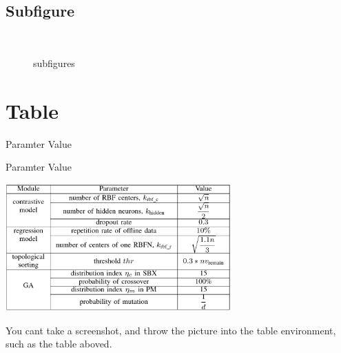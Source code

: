 \documentclass[
    UTF8
]{report}
\begin{document}
\subsection{Subfigure}

\begin{figure}[H]
    \centering
    \hspace{1em}
    ~\\
    \hspace{1em}
    \caption{subfigures}
    \label{fig:subfig}
\end{figure}

\section{Table}
\begin{table}[H]
    \centering
    \caption{Paramter Value}
    \label{tb:paramter}
    
\end{table}
\begin{table}[H]
    \centering
    \caption{Paramter Value}
    \label{tb:figure}
    \includegraphics[width=0.65\textwidth]{./table/figure.png}
\end{table}
You cant take a screenshot, and throw the picture into the table environment, such as the table aboved.
\end{document}

